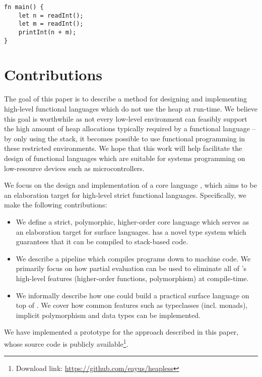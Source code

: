 \documentclass[runningheads]{llncs}
\begin{document}
\begin{verbatim}
fn main() {
    let n = readInt();
    let m = readInt();
    printInt(n + m);
}
\end{verbatim}

\section{Contributions}

The goal of this paper is to describe a method for designing and implementing high-level functional languages which do not use the heap at run-time. We believe this goal is worthwhile as not every low-level environment can feasibly support the high amount of heap allocations typically required by a functional language -- by only using the stack, it becomes possible to use functional programming in these restricted environments. We hope that this work will help facilitate the design of functional languages which are suitable for systems programming on low-resource devices such as microcontrollers.

We focus on the design and implementation of a core language \core{}, which aims to be an elaboration target for high-level strict functional languages. Specifically, we make the following contributions:

\begin{itemize}
  \item We define a strict, polymorphic, higher-order core language \core{} which serves as an elaboration target for surface languages. \core{} has a novel type system which guarantees that it can be compiled to stack-based code.

  \item We describe a pipeline which compiles \core{} programs down to machine code. We primarily focus on how partial evaluation can be used to eliminate all of \core{}'s high-level features (higher-order functions, polymorphism) at compile-time. 
  
  \item We informally describe how one could build a practical surface language on top of \core{}. We cover how common features such as typeclasses (incl. monads), implicit polymorphism and data types can be implemented.
\end{itemize}

We have implemented a prototype for the approach described in this paper, whose source code is publicly available\footnote{Download link: \url{https://github.com/eayus/heapless}}.
\end{document}
